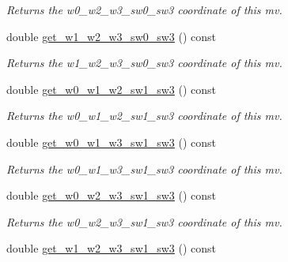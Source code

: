 \begin{DoxyCompactItemize}
\begin{DoxyCompactList}\small\item\em Returns the w0\-\_\-w2\-\_\-w3\-\_\-sw0\-\_\-sw3 coordinate of this mv. \end{DoxyCompactList}\item 
\hypertarget{classe3ga_1_1mv_a3fa070abd0fdc12816f44724009a4242}{double \hyperlink{classe3ga_1_1mv_a3fa070abd0fdc12816f44724009a4242}{get\-\_\-w1\-\_\-w2\-\_\-w3\-\_\-sw0\-\_\-sw3} () const }\label{classe3ga_1_1mv_a3fa070abd0fdc12816f44724009a4242}

\begin{DoxyCompactList}\small\item\em Returns the w1\-\_\-w2\-\_\-w3\-\_\-sw0\-\_\-sw3 coordinate of this mv. \end{DoxyCompactList}\item 
\hypertarget{classe3ga_1_1mv_a36533a0bc6d4cf842d822e4db3313451}{double \hyperlink{classe3ga_1_1mv_a36533a0bc6d4cf842d822e4db3313451}{get\-\_\-w0\-\_\-w1\-\_\-w2\-\_\-sw1\-\_\-sw3} () const }\label{classe3ga_1_1mv_a36533a0bc6d4cf842d822e4db3313451}

\begin{DoxyCompactList}\small\item\em Returns the w0\-\_\-w1\-\_\-w2\-\_\-sw1\-\_\-sw3 coordinate of this mv. \end{DoxyCompactList}\item 
\hypertarget{classe3ga_1_1mv_a8624a7692fefb1658d8c62544eb4430e}{double \hyperlink{classe3ga_1_1mv_a8624a7692fefb1658d8c62544eb4430e}{get\-\_\-w0\-\_\-w1\-\_\-w3\-\_\-sw1\-\_\-sw3} () const }\label{classe3ga_1_1mv_a8624a7692fefb1658d8c62544eb4430e}

\begin{DoxyCompactList}\small\item\em Returns the w0\-\_\-w1\-\_\-w3\-\_\-sw1\-\_\-sw3 coordinate of this mv. \end{DoxyCompactList}\item 
\hypertarget{classe3ga_1_1mv_ac4d3545f6a85ce69f6be8f59fc7c0312}{double \hyperlink{classe3ga_1_1mv_ac4d3545f6a85ce69f6be8f59fc7c0312}{get\-\_\-w0\-\_\-w2\-\_\-w3\-\_\-sw1\-\_\-sw3} () const }\label{classe3ga_1_1mv_ac4d3545f6a85ce69f6be8f59fc7c0312}

\begin{DoxyCompactList}\small\item\em Returns the w0\-\_\-w2\-\_\-w3\-\_\-sw1\-\_\-sw3 coordinate of this mv. \end{DoxyCompactList}\item 
\hypertarget{classe3ga_1_1mv_a9cfb962ec0bccda86eebf5260d31061c}{double \hyperlink{classe3ga_1_1mv_a9cfb962ec0bccda86eebf5260d31061c}{get\-\_\-w1\-\_\-w2\-\_\-w3\-\_\-sw1\-\_\-sw3} () const }\label{classe3ga_1_1mv_a9cfb962ec0bccda86eebf5260d31061c}


\end{DoxyCompactItemize}
